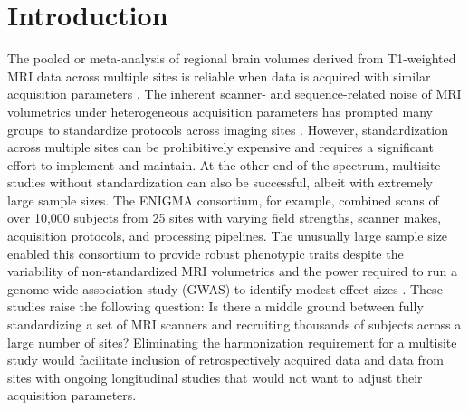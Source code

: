 \documentclass{article}
\begin{document}
\section{Introduction}
The pooled  or meta-analysis of regional brain volumes derived from T1-weighted MRI data across multiple sites is reliable when data is acquired with similar acquisition parameters \cite{cannon2014,multicenter01,freesurferReliability}. The inherent scanner- and sequence-related noise of MRI volumetrics under heterogeneous acquisition parameters has prompted many groups to standardize protocols across imaging sites \cite{cannon2014,adniharmonize,ADNIReview}. However, standardization across multiple sites can be prohibitively expensive and requires a significant effort to implement and maintain. %
At the other end of the spectrum, multisite studies without standardization can also be successful, albeit with extremely large sample sizes. The ENIGMA consortium, for example, combined scans of over 10,000 subjects from 25 sites with varying field strengths, scanner makes, acquisition protocols, and processing pipelines. The unusually large sample size enabled this consortium to provide robust phenotypic traits despite the variability of non-standardized MRI volumetrics and the power required to run a genome wide association study (GWAS) to identify modest effect sizes \cite{thompson2014enigma}. These studies raise the following question: Is there a middle ground between fully standardizing a set of MRI scanners and recruiting thousands of subjects across a large number of sites? Eliminating the harmonization requirement for a multisite study would facilitate inclusion of retrospectively acquired data and data from sites with ongoing longitudinal studies that would not want to adjust their acquisition parameters.
\end{document}
